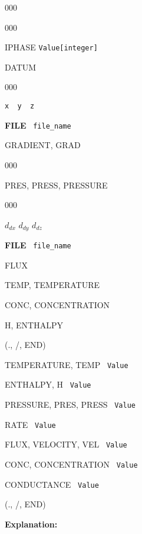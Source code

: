 \documentclass[12pt]{article}
\begin{document}
\begin{deflist}{000}
\begin{deflist}{000}
\item[IPHASE] {\tt Value[integer]}

\item[DATUM] ~
\begin{deflist}{000}
\item[{\tt x \ y \ z}]
\item[{\bf FILE} \ {\tt file\_name}]
\end{deflist}
\item[GRADIENT, GRAD] ~
\begin{deflist}{000}
\item [PRES, PRESS, PRESSURE] ~
\begin{deflist}{000}
\item[$d_{dx}$ $d_{dy}$ $d_{dz}$]
\item[{\bf FILE} \ {\tt file\_name}]
\end{deflist}
\item [FLUX]
\item [TEMP, TEMPERATURE]
\item [CONC, CONCENTRATION]
\item [H, ENTHALPY]
\end{deflist}
\item[(., /, END)]
\item[TEMPERATURE, TEMP] \ {\tt Value}
\item[ENTHALPY, H] \ {\tt Value}
\item[PRESSURE, PRES, PRESS] \ {\tt Value}
\item[RATE] \ {\tt Value}
\item[FLUX, VELOCITY, VEL] \ {\tt Value}
\item[CONC, CONCENTRATION] \ {\tt Value}
\item[CONDUCTANCE] \ {\tt Value}
\end{deflist}
\item[(., /, END)] ~
\end{deflist}

{\noindent\bf Explanation:}
\end{document}
